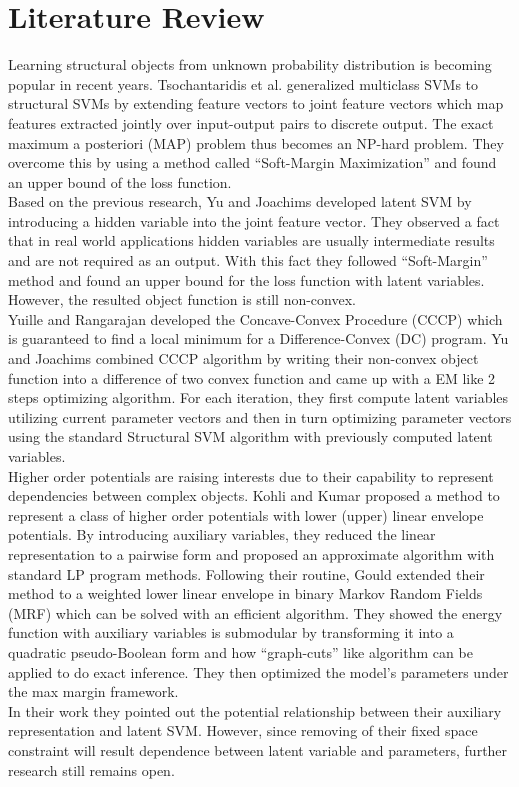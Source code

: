 \documentclass{article}
\begin{document}
	\section{Literature Review}
	Learning structural objects from unknown probability distribution is becoming popular in recent years. Tsochantaridis et al.\cite{tsochantaridis2005large} generalized multiclass SVMs\cite{crammer2002algorithmic} to structural SVMs by extending feature vectors to joint feature vectors which map features extracted jointly over input-output pairs to discrete output. The exact maximum a posteriori (MAP) problem thus becomes an NP-hard problem. They overcome this by using a method called “Soft-Margin Maximization” and found an upper bound of the loss function.\\
	Based on the previous research, Yu and Joachims\cite{yu2009learning} developed latent SVM by introducing a hidden variable into the joint feature vector. They observed a fact that in real world applications hidden variables are usually intermediate results and are not required as an output. With this fact they followed “Soft-Margin” method and found an upper bound for the loss function with latent variables. However, the resulted object function is still non-convex.\\
	Yuille and Rangarajan \cite{yuille2002concave} developed the Concave-Convex Procedure (CCCP) which is guaranteed to find a local minimum for a Difference-Convex (DC) program. Yu and Joachims\cite{yu2009learning} combined CCCP algorithm by writing their non-convex object function into a difference of two convex function and came up with a EM like 2 steps optimizing algorithm. For each iteration, they first compute latent variables utilizing current parameter vectors and then in turn optimizing parameter vectors using the standard Structural SVM algorithm with previously computed latent variables. \\
	Higher order potentials are raising interests due to their capability to represent dependencies between complex objects. Kohli and Kumar\cite{kohli2009robust} proposed a method to represent a class of higher order potentials with lower (upper) linear envelope potentials. By introducing auxiliary variables, they reduced the linear representation to a pairwise form and proposed an approximate algorithm with standard LP program methods. Following their routine, Gould\cite{gouldlearning} extended their method to a weighted lower linear envelope in binary Markov Random Fields (MRF) which can be solved with an efficient algorithm. They showed the energy function with auxiliary variables is submodular by transforming it into a quadratic pseudo-Boolean form and how “graph-cuts” like algorithm can be applied to do exact inference. They then optimized the model’s parameters under the max margin framework\cite{tsochantaridis2005large}. \\
	In their work they pointed out the potential relationship between their auxiliary representation and latent SVM\cite{yu2009learning}. However, since removing of their fixed space constraint will result dependence between latent variable and parameters, further research still remains open.
\end{document}
